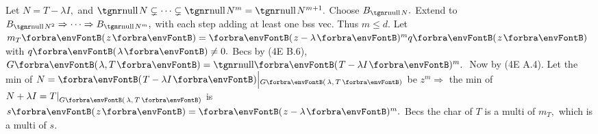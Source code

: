 Let $N=T-\lambda I,$ and $\null N\subsetneq\cdots\subsetneq\null N^m=\null N^{m+1}.$ Choose $B_{\null N}.$\parSol{}
Extend to $B_{\null N^2}\Rightarrow\cdots\Rightarrow B_{\null N^m},$ with each step adding at least one bss vec. Thus $m\leqslant d.$\PfEnd\vspace{3pt}\parSol{}
\Or Let $m_T\Par{z}=\Par{z-\lambda}{^m}q\Par{z}$ with $q\Par{\lambda}\neq0.$\parSol{}
Becs by (4E B.6), $G\Par{\lambda,T}=\Null\Par{T-\lambda I}{^m}.$ \,Now by (4E A.4).\PfEnd\vspace{3pt}\parSol{}
\Or Let the min of $N=\Par{T-\lambda I}\Big|{_{G\SmallPar{\:\!\lambda,\,T\:\!}}}$ be $z^m\Rightarrow$ the min of $N+\lambda I=T\mmid_{G\SmallPar{\:\!\lambda,\,T\:\!}}$ is $s\Par{z}=\Par{z-\lambda}{^m}.$\parSol{}
Becs the char of $T$  is a multi of $m_T,$ which is a multi of $s.$\PfEnd
\SepLine

